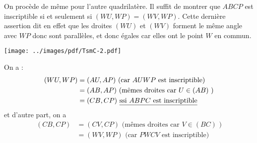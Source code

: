 {\begin{enumerate}
{On procède de même pour l'autre quadrilatère.
Il suffit de montrer que $ABCP$ est inscriptible si et seulement si $(WU,WP)=(WV,WP)$. 
Cette dernière assertion dit en effet que les droites $(WU)$ et $(WV)$ forment le même angle avec $WP$ donc sont parallèles, et donc égales car elles ont le point $W$ en commun.

\begin{center}
\texttt{[image: ../images/pdf/TsmC-2.pdf]}
\end{center}
On a :
\begin{align*}
(WU,WP)
&= (AU,AP) \text{ (car $AUWP$ est inscriptible)}\\
&= (AB,AP) \text{ (mêmes droites car $U\in (AB)$ )}\\
&= (CB,CP) \text{ \underline{ssi $ABPC$ est inscriptible}}
\end{align*}
et d'autre part, on a 
\begin{align*}
(CB,CP)
&= (CV,CP) \text{ (mêmes droites car $V\in (BC)$ )}\\
&= (WV,WP) \text{ (car $PWCV$ est inscriptible)}
\end{align*}
}
\end{enumerate}
}
